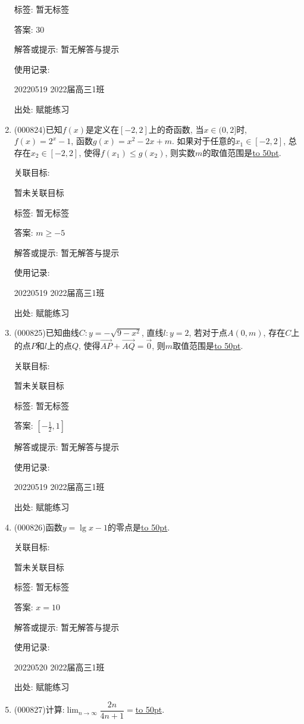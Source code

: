\documentclass[10pt,a4paper]{article}
\newcommand{\blank}[1]{\underline{\hbox to #1pt{}}}
\begin{document}
\begin{enumerate}[1.]
标签: 暂无标签

答案: $30$

解答或提示: 暂无解答与提示

使用记录:

20220519	2022届高三1班	


出处: 赋能练习
\item { (000824)}已知$f(x)$是定义在$[-2,2]$上的奇函数, 当$x\in (0,2]$时,$f(x)=2^x-1$, 函数$g(x)=x^2-2x+m$. 如果对于任意的$x_1\in [-2,2]$, 总存在$x_2\in [-2,2]$, 使得$f(x_1)\le g(x_2)$, 则实数$m$的取值范围是\blank{50}.


关联目标:

暂未关联目标



标签: 暂无标签

答案: $m\ge -5$

解答或提示: 暂无解答与提示

使用记录:

20220519	2022届高三1班	


出处: 赋能练习
\item { (000825)}已知曲线$C:y=-\sqrt{9-x^2}$, 直线$l:y=2$, 若对于点$A(0,m)$, 存在$C$上的点$P$和$l$上的点$Q$, 使得$\overrightarrow{AP}+\overrightarrow{AQ}=\overrightarrow 0$, 则$m$取值范围是\blank{50}.


关联目标:

暂未关联目标



标签: 暂无标签

答案: $[-\frac 12,1]$

解答或提示: 暂无解答与提示

使用记录:

20220519	2022届高三1班	


出处: 赋能练习
\item { (000826)}函数$y=\lg x-1$的零点是\blank{50}.


关联目标:

暂未关联目标



标签: 暂无标签

答案: $x=10$

解答或提示: 暂无解答与提示

使用记录:

20220520	2022届高三1班	


出处: 赋能练习
\item { (000827)}计算:$\displaystyle\lim_{n\to\infty}\dfrac{2n}{4n+1}=$\blank{50}.



\end{enumerate}
\end{document}
